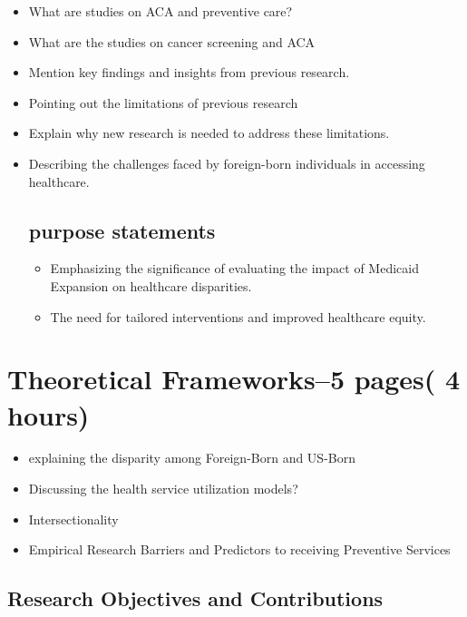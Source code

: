 \documentclass[10pt, oneside]{article}
\begin{document}
\begin{itemize}
\item What are studies on ACA and preventive care? 
\item What are the studies on cancer screening and ACA
\item Mention key findings and insights from previous research.
\item Pointing out the limitations of previous research
\item Explain why new research is needed to address these limitations.
\item Describing the challenges faced by foreign-born individuals in accessing healthcare.

\subsection{purpose statements}
\begin{itemize}
\item Emphasizing the significance of evaluating the impact of Medicaid Expansion on healthcare disparities.
\item The need for tailored interventions and improved healthcare equity.
\end{itemize}

\end{itemize}


\section{Theoretical Frameworks--5 pages( 4 hours)}

\begin{itemize}
\item explaining the disparity among Foreign-Born and US-Born
    \item Discussing the health service utilization models?
    \item Intersectionality 
    \item Empirical Research Barriers and Predictors to receiving Preventive Services

\end{itemize}


\subsection{Research Objectives and Contributions}
\end{document}
